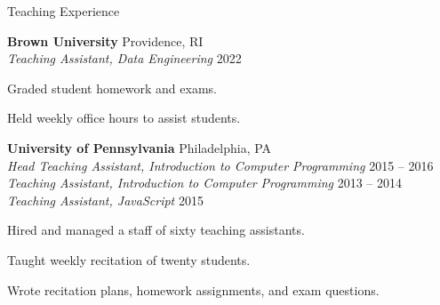 \documentclass{resume} %
\begin{document}
\begin{grouping}{Teaching Experience}

\item {\bf Brown University } \hfill Providence, RI \\
    {\em Teaching Assistant, Data Engineering} \hfill 2022
    \begin{items}
        \item Graded student homework and exams.
        \item Held weekly office hours to assist students.
    \end{items}

\item {\bf University of Pennsylvania } \hfill Philadelphia, PA \\
    {\em Head Teaching Assistant, Introduction to Computer Programming} \hfill 2015 -- 2016 \\
    {\em Teaching Assistant, Introduction to Computer Programming} \hfill 2013 -- 2014 \\
    {\em Teaching Assistant, JavaScript} \hfill 2015
    \begin{items}
        \item Hired and managed a staff of sixty teaching assistants.
        \item Taught weekly recitation of twenty students.
        \item Wrote recitation plans, homework assignments, and exam questions.
    \end{items}


\end{grouping}
\end{document}
